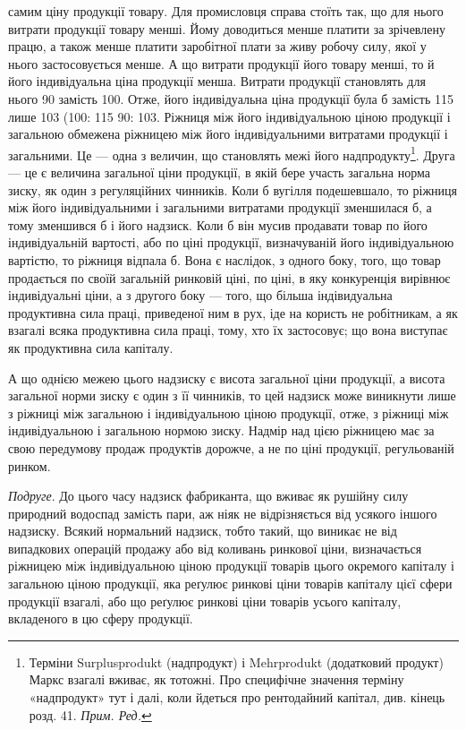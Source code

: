 \parcont{}  %
самим ціну продукції товару. Для промисловця справа стоїть так, що для нього
витрати продукції товару менші. Йому доводиться менше платити за зрічевлену
працю, а також менше платити заробітної плати за живу робочу силу, якої
у нього застосовується менше. А що витрати продукції його товару менші,
то й його індивідуальна ціна продукції менша. Витрати продукції становлять для
нього 90 замість 100. Отже, його індивідуальна ціна продукції була б замість
115 лише 103 (100: 115 \deq{} 90: 103. Ріжниця між його індивідуальною ціною
продукції і загальною обмежена ріжницею між його індивідуальними витратами
продукції і загальними. Це — одна з величин, що становлять межі його надпродукту\footnote{Терміни Surplusprodukt (надпродукт) і Mehrprodukt (додатковий продукт) Маркс взагалі вживає,
як тотожні. Про специфічне значення терміну «надпродукт» тут і далі, коли йдеться
про рентодайний капітал, див. кінець розд. 41. \emph{Прим. Ред.}}. Друга — це є величина загальної ціни продукції, в якій бере участь
загальна норма зиску, як один з регуляційних чинників. Коли б вугілля подешевшало,
то ріжниця між його індивідуальними і загальними витратами продукції
зменшилася б, а тому зменшився б і його надзиск. Коли б він мусив продавати
товар по його індивідуальній вартості, або по ціні продукції, визначуваній
його індивідуальною вартістю, то ріжниця відпала б. Вона є наслідок, з одного
боку, того, що товар продається по своїй загальній ринковій ціні, по ціні,
в яку конкуренція вирівнює індивідуальні ціни, а з другого боку — того, що
більша індівидуальна продуктивна сила праці, приведеної ним в рух, іде на користь
не робітникам, а як взагалі всяка продуктивна сила праці, тому, хто їх
застосовує; що вона виступає як продуктивна сила капіталу.

А що однією межею цього надзиску є висота загальної ціни продукції,
а висота загальної норми зиску є один з її чинників, то цей надзиск може
виникнути лише з ріжниці між загальною і індивідуальною ціною продукції,
отже, з ріжниці між індивідуальною і загальною нормою зиску. Надмір над цією
ріжницею має за свою передумову продаж продуктів дорожче, а не по ціні
продукції, регульованій ринком.

\emph{Подруге}. До цього часу надзиск фабриканта, що вживає як рушійну силу
природний водоспад замість пари, аж ніяк не відрізняється від усякого іншого
надзиску. Всякий нормальний надзиск, тобто такий, що виникає не від випадкових
операцій продажу або від коливань ринкової ціни, визначається ріжницею між
індивідуальною ціною продукції товарів цього окремого капіталу і загальною
ціною продукції, яка реґулює ринкові ціни товарів капіталу цієї сфери продукції
взагалі, або що реґулює ринкові ціни товарів усього капіталу, вкладеного в цю
сферу продукції.

